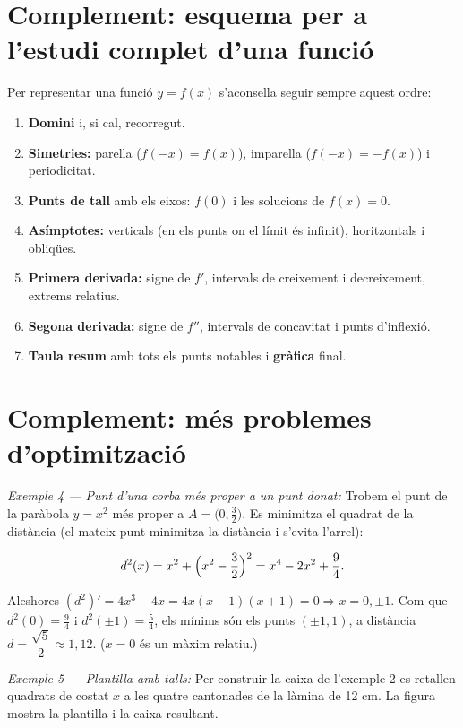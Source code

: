 \section{Complement: esquema per a l'estudi complet d'una funció}

Per representar una funció $y=f(x)$ s'aconsella seguir sempre aquest ordre:

\begin{enumerate}
\item \textbf{Domini} i, si cal, recorregut.
\item \textbf{Simetries:} parella ($f(-x)=f(x)$), imparella ($f(-x)=-f(x)$) i periodicitat.
\item \textbf{Punts de tall} amb els eixos: $f(0)$ i les solucions de $f(x)=0$.
\item \textbf{Asímptotes:} verticals (en els punts on el límit és infinit), horitzontals i obliqües.
\item \textbf{Primera derivada:} signe de $f'$, intervals de creixement i decreixement, extrems relatius.
\item \textbf{Segona derivada:} signe de $f''$, intervals de concavitat i punts d'inflexió.
\item \textbf{Taula resum} amb tots els punts notables i \textbf{gràfica} final.
\end{enumerate}

\section{Complement: més problemes d'optimització}

\emph{Exemple 4 --- Punt d'una corba més proper a un punt donat:} Trobem el punt de la paràbola $y=x^2$ més proper a $A=\bigl(0,\tfrac32\bigr)$. Es minimitza el quadrat de la distància (el mateix punt minimitza la distància i s'evita l'arrel):

\begin{equation*}
d^2(x)=x^2+\Bigl(x^2-\frac32\Bigr)^2=x^4-2x^2+\frac94.
\end{equation*}

Aleshores $(d^2)'=4x^3-4x=4x(x-1)(x+1)=0\Rightarrow x=0,\pm1$. Com que $d^2(0)=\tfrac94$ i $d^2(\pm1)=\tfrac54$, els mínims són els punts $(\pm1,1)$, a distància $d=\dfrac{\sqrt5}{2}\approx1{,}12$. ($x=0$ és un màxim relatiu.)

\emph{Exemple 5 --- Plantilla amb talls:} Per construir la caixa de l'exemple 2 es retallen quadrats de costat $x$ a les quatre cantonades de la làmina de 12 cm. La figura mostra la plantilla i la caixa resultant.

